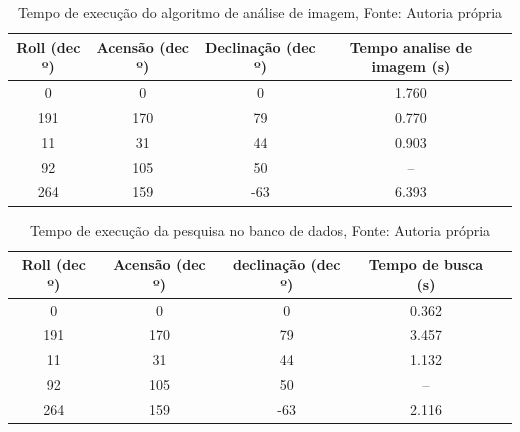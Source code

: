 \begin{table}[ht]
    \centering

    \begin{tabular}{|c|c|c|c|c|}
        \hline
        \textbf{Roll (dec º)} & \textbf{Acensão (dec º)} & \textbf{Declinação (dec º)} & \textbf{Tempo analise de imagem (s)} \\ \hline
        0                     & 0                        & 0                           & 1.760                                \\ \hline
        191                   & 170                      & 79                          & 0.770                                \\ \hline
        11                    & 31                       & 44                          & 0.903                                \\ \hline
        92                    & 105                      & 50                          & --                                   \\ \hline
        264                   & 159                      & -63                         & 6.393                                \\ \hline
    \end{tabular}
    \caption{Tempo de execução do algoritmo de análise de imagem, Fonte: Autoria própria}
    \label{tab:tempo_de_execucao_img}
\end{table}

\begin{table}[ht]
    \centering

    \begin{tabular}{|c|c|c|c|c|}
        \hline
        \textbf{Roll (dec º)} & \textbf{Acensão (dec º)} & \textbf{declinação (dec º)} & \textbf{Tempo de busca (s)} \\ \hline
        0                     & 0                        & 0                           & 0.362                       \\ \hline
        191                   & 170                      & 79                          & 3.457                       \\ \hline
        11                    & 31                       & 44                          & 1.132                       \\ \hline
        92                    & 105                      & 50                          & --                          \\ \hline
        264                   & 159                      & -63                         & 2.116                       \\ \hline
    \end{tabular}
    \caption{Tempo de execução da pesquisa no banco de dados, Fonte: Autoria própria}
    \label{tab:tempo_de_execucao_db}
\end{table}

